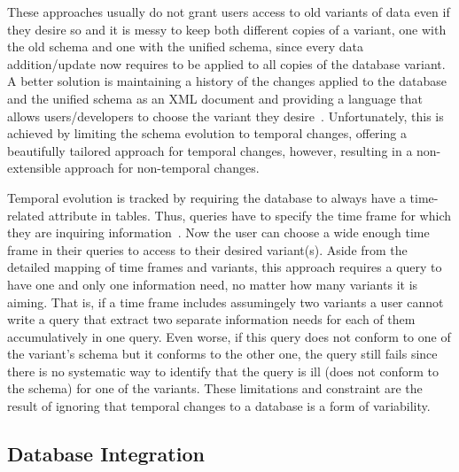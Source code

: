 These approaches usually do not
grant users access to old variants of data even if they desire so and it
is messy to keep both different copies of a variant, one with the old schema
and one with the unified schema, since every data addition/update now requires to 
be applied to all copies of the database variant. A better solution
is maintaining a history of the changes applied to the database and the unified schema
as an XML document and providing a language that allows users/developers to choose
the variant they desire~\cite{prima08Moon}. Unfortunately, this is achieved by limiting
the schema evolution to temporal changes, offering a beautifully tailored approach for 
temporal changes, however, resulting in a non-extensible approach for non-temporal changes.

Temporal evolution is tracked by requiring the database to always have a time-related 
attribute in tables. Thus, queries have to specify the time frame for which they are inquiring 
information~\cite{prima08Moon}. 
Now the user can choose a wide enough time frame in their queries to access 
to their desired variant(s). Aside from the detailed mapping of time frames and variants, this
approach requires a query to have one and only one information need, no matter how many
variants it is aiming. That is, if a time frame includes assumingely two variants a user cannot 
write a query that extract two separate information needs for each of them accumulatively 
in one query. Even worse, if this query does not conform to one of the variant's schema
but it conforms to the other one, the query still fails since there is no systematic way to 
identify that the query is ill (does not conform to the schema) for one of the variants. 
These limitations and constraint are the result of ignoring that temporal changes to a 
database is a form of variability.

\subsection{Database Integration}
\label{sec:db-intg}

